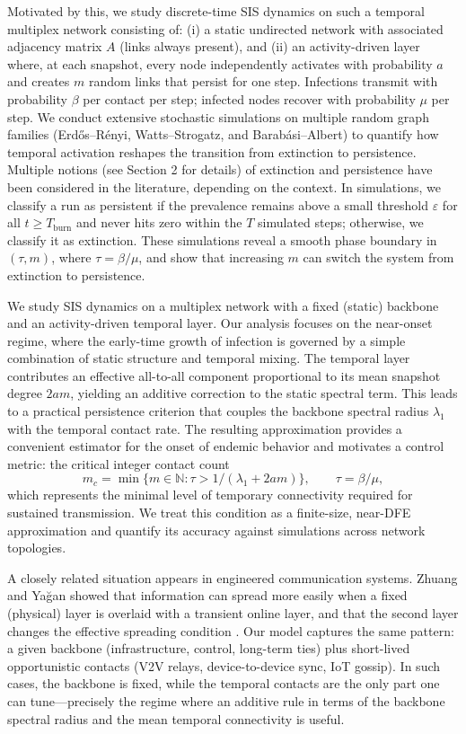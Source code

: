 \documentclass[pdflatex,sn-mathphys-num]{sn-jnl}%
\theoremstyle{thmstyleone}%
\theoremstyle{thmstyletwo}%
\theoremstyle{thmstylethree}%
\begin{document}
Motivated by this, we study discrete-time SIS dynamics on such a temporal multiplex network consisting of:
(i) a static undirected network with associated adjacency matrix $A$ (links always present), and
(ii) an activity-driven layer where, at each snapshot, every node independently activates with probability $a$ and creates $m$ random links that persist for one step. Infections transmit with probability $\beta$ per contact per step; infected nodes recover with probability $\mu$ per step.
We conduct extensive stochastic simulations on multiple random graph families (Erd\H{o}s--R\'enyi, Watts--Strogatz, and Barab\'asi--Albert) to quantify how temporal activation reshapes the transition from extinction to persistence. Multiple notions (see Section 2 for details) of extinction and persistence have been considered in the literature, depending on the context. In simulations, we classify a run as persistent if the prevalence remains above a small threshold $\varepsilon$ for all $t \ge T_{\mathrm{burn}}$ and never hits zero within the $T$ simulated steps; otherwise, we classify it as extinction. These simulations reveal a smooth phase boundary in $(\tau,m)$, where $\tau=\beta/\mu$, and show that increasing $m$ can switch the system from extinction to persistence. 


We study SIS dynamics on a multiplex network with a fixed (static) backbone and an activity-driven temporal layer. Our analysis focuses on the near-onset regime, where the early-time growth of infection is governed by a simple combination of static structure and temporal mixing. The temporal layer contributes an effective all-to-all component proportional to its mean snapshot degree $2am$, yielding an additive correction to the static spectral term. This leads to a practical persistence criterion that couples the backbone spectral radius $\lambda_1$ with the temporal contact rate. The resulting approximation provides a convenient estimator for the onset of endemic behavior and motivates a control metric: the critical integer contact count
\[
m_c = \min\{ m\in\mathbb{N} : \tau > 1/(\lambda_1+2am) \}, \qquad \tau=\beta/\mu,
\]
which represents the minimal level of temporary connectivity required for sustained transmission. We treat this condition as a finite-size, near-DFE approximation and quantify its accuracy against simulations across network topologies.

A closely related situation appears in engineered communication systems. Zhuang and Ya\u{g}an showed that information can spread more easily when a fixed (physical) layer is overlaid with a transient online layer, and that the second layer changes the effective spreading condition \cite{ZhuangYagan2016}. Our model captures the same pattern: a given backbone (infrastructure, control, long-term ties) plus short-lived opportunistic contacts (V2V relays, device-to-device sync, IoT gossip). In such cases, the backbone is fixed, while the temporal contacts are the only part one can tune—precisely the regime where an additive rule in terms of the backbone spectral radius and the mean temporal connectivity is useful.
\end{document}
